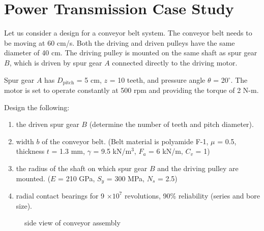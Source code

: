 \documentclass[
10pt,
a4paper,
openany,
svgnames,
]{book}
\begin{document}
\chapter{Power Transmission Case Study}

\begin{example}

Let us consider a design for a conveyor belt system. The conveyor belt needs to be moving at 60 cm/s. Both the driving and driven pulleys have the same diameter of 40 cm. The driving pulley is mounted on the same shaft as spur gear $B$, which is driven by spur gear $A$ connected directly to the driving motor.

Spur gear $A$ has $D_{\text{pitch}}$ = 5 cm, $z$ = 10 teeth, and pressure angle $\theta$ = 20$^{\circ}$. The motor is set to operate constantly at 500 rpm and providing the torque of 2 N-m.

Design the following:

\begin{enumerate}
  \item the driven spur gear $B$ (determine the number of teeth and pitch diameter).
  \item width $b$ of the conveyor belt. (Belt material is polyamide F-1, $\mu$ = 0.5, thickness $t$ = 1.3 mm, $\gamma$ = 9.5 kN/m$^{3}$, $F_{a}$ = 6 kN/m, $C_{v}$ = 1)
  \item the radius of the shaft on which spur gear $B$ and the driving pulley are mounted. ($E$ = 210 GPa, $S_{y}$ = 300 MPa, $N_{s}$ = 2.5)
  \item radial contact bearings for 9 $\times 10^{7}$ revolutions, 90\% reliability (series and bore size).
\end{enumerate}

\begin{figure}[H]
  \centering
\caption{side view of conveyor assembly}
\end{figure}


\end{example}
\end{document}

